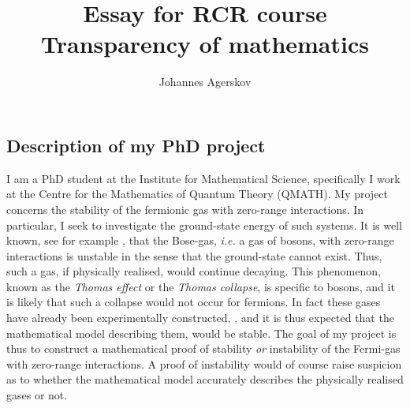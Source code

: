 \documentclass[a4paper, 11pt]{article} %
\title{Essay for RCR course\\
	\large Transparency of mathematics}
\author{Johannes Agerskov}
\begin{document}
	\maketitle
\subsection*{Description of my PhD project}
I am a PhD student at the Institute for Mathematical Science, specifically I work at the Centre for the Mathematics of Quantum Theory (QMATH). My project concerns the stability of the fermionic gas with zero-range interactions. In particular, I seek to investigate the ground-state energy of such systems. It is well known, see for example \cite{PhysRev.47.903}, that the Bose-gas, \emph{i.e.} a gas of bosons, with zero-range interactions is unstable in the sense that the ground-state cannot exist. Thus, such a gas, if physically realised, would continue decaying. This phenomenon, known as the \emph{Thomas effect} or the \emph{Thomas collapse}, is specific to bosons, and it is likely that such a collapse would not occur for fermions. In fact these gases have already been experimentally constructed, \cite{PhysRevLett.105.070402}, and it is thus expected that the mathematical model describing them, would be stable. The goal of my project is thus to construct a mathematical proof of stability \emph{or} instability of the Fermi-gas with zero-range interactions. A proof of instability would of course raise suspicion as to whether the mathematical model accurately describes the physically realised gases or not.
\end{document}
